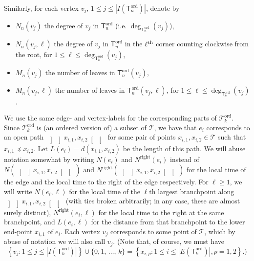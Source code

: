 \documentclass[10pt]{amsart}
\theoremstyle{definition}\newtheorem{defi}[theo]{Definition}\newtheorem{rema}[theo]{Remark}\newtheorem{exam}[theo]{Example}\newtheorem{exem}[theo]{Example}\newtheorem{nota}[theo]{Notation}
\newcommand{\abs}[1]{\left\lvert#1\right\rvert}
\newcommand{\oseg}[2]{\, \left] \! \left] #1, #2 \right[\! \right[\,}
\newcommand{\ord}{\mathrm{ord}}
\newcommand{\Rightll}{\mathrm{right}}
\newcommand{\cT}{\mathcal{T}}
\newcommand{\sT}{\mathsf{T}}
\begin{document}
Similarly, for each vertex $v_j$, $1 \leq j \leq \abs{I(\sT^{\ord}_n)}$, denote by
\begin{itemize}
\item $N_{n}(v_j)$ the degree of $v_j$ in $\sT^{\ord}_n$ (i.e. $\deg_{\sT_n^{\ord}}(v_j)$),
\item $N_{n}(v_j,\ell)$ the degree of $v_j$ in $\sT_n^{\ord}$ in the $\ell^{\rm th}$ corner counting clockwise from the root, for $1 \leq \ell \leq \deg_{\sT_k^{\ord}}(v_j)$,
\item $M_{n}(v_j)$ the number of leaves in $\sT_n^{\ord}(v_j)$,
\item $M_{n}(v_j,\ell)$ the number of leaves in $\sT_n^{\ord}(v_j, \ell)$, for $1 \leq \ell \leq \deg_{\sT_k^{\ord}}(v_j)$.
\end{itemize}
We use the same edge- and vertex-labels for the corresponding parts of $\cT^{\ord}_k$. Since $\cT^{\ord}_k$ is (an ordered version of) a subset of $\cT$, we have that $e_i$ corresponds to an open path $\oseg{x_{i,1}}{x_{i,2}}$ for some pair of points $x_{i,1}, x_{i,2} \in \cT$ such that $x_{i,1} \preceq x_{i,2}$. Let $L(e_i)=d(x_{i,1}, x_{i,2})$ be the length of this path. We will abuse notation somewhat by writing $N(e_i)$ and $N^{\Rightll}(e_i)$ instead of $N(\oseg{x_{i,1}}{x_{i,2}})$ and $N^{\Rightll}(\oseg{x_{i,1}}{x_{i,2}})$ for the local time of the edge and the local time to the right of the edge respectively. For $\ell \ge 1$, we will write $N(e_i, \ell)$ for the local time of the $\ell$th largest branchpoint along $\oseg{x_{i,1}}{x_{i,2}}$ (with ties broken arbitrarily; in any case, these are almost surely distinct), $N^{\Rightll}(e_i, \ell)$ for the local time to the right at the same branchpoint, and $L(e_i,\ell)$ for the distance from that branchpoint to the lower end-point $x_{i,1}$ of $e_i$. Each vertex $v_j$ corresponds to some point of $\cT$, which by abuse of notation we will also call $v_j$. (Note that, of course, we must have 
\[
\left\{v_j: 1 \le j \le \abs{I\left(\sT_k^{\ord}\right)}\right\} \cup \{0,1,\,\ldots,\,k\}= 
\left\{x_{i,p}: 1 \le i \le \abs{E\left(\sT_k^{\ord}\right)}, p=1,2\right\}.)
\]
\end{document}
